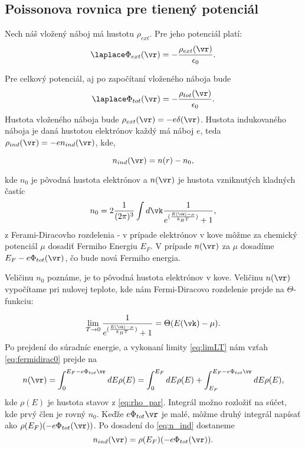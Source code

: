 \renewcommand{\thesection}{B.\arabic{section}}
\renewcommand{\theequation}{B.\arabic{equation}}
\renewcommand{\thefigure}{B.\arabic{figure}}
\setcounter{equation}{0}
\subsection*{Poissonova rovnica pre tienený potenciál}
Nech náš vložený náboj má hustotu $\rho_{ext}$. Pre jeho potenciál platí:
\begin{equation}
 \label{eq:poisext}
 \laplace \Phi_{ext}(\vr)=-\frac{\rho_{ext}(\vr)}{\epsilon_0} \text{.}
\end{equation} 

Pre celkový potenciál, aj po započítaní vloženého náboja bude 
\begin{equation}
 \label{eq:poistot}
 \laplace \Phi_{tot}(\vr)=-\frac{\rho_{tot}(\vr)}{\epsilon_0} \text{.}
\end{equation}
Hustota vloženého náboja bude $\rho_{ext}(\vr)=-e\delta(\vr)$. Hustota indukovaného náboja je daná hustotou elektrónov každý má náboj $e$, teda $\rho_{ind}(\vr)=-en_{ind}(\vr)$,
kde,

\begin{equation}
 \label{eq:n_ind}
 n_{ind}(\vr)=n(r)-n_0 \text{,}
\end{equation} 

kde $n_0$ je pôvodná hustota elektrónov a $n(\vr)$ je hustota vzniknutých kladných častíc 
\begin{equation}
 \label{eq:fermidirac0}
 n_0=2\frac{1}{(2\pi)^3}\int d\vk \frac{1}{e^{(\frac{E(\vk)-\mu}{k_BT})}+1} \text{,}
\end{equation} 
 z Ferami-Diracovho rozdelenia - v prípade elektrónov v kove môžme za chemický  potenciál $\mu$ dosadiť Fermiho Energiu $E_F$.
 V prípade $n(\vr)$ za $\mu$ dosadíme $E_F-e\Phi_{tot}(\vr)$, čo bude nová Fermiho energia.
 
 Veličinu $n_0$ poznáme, je to pôvodná hustota elektrónov v kove. Veličinu $n(\vr)$ vypočítame pri nulovej teplote, kde nám Fermi-Diracovo rozdelenie
 prejde na $\Theta$-funkciu:
 
 \begin{equation}
  \label{eq:limLT}
  \lim_{T\to 0} \frac{1}{e^{(\frac{E(\vk)-\mu}{k_BT})}+1}=\Theta(E(\vk)-\mu) \text{.}
 \end{equation} 
 Po prejdení do súradníc energie, a vykonaní limity \eqref{eq:limLT} nám vzťah \eqref{eq:fermidirac0} prejde na 
 \begin{equation}
  \label{eq:nr}
  n(\vr)=\int_{0}^{E_F-e\Phi_{tot}{\vr}}dE \rho(E)=\int_{0}^{E_F}dE \rho(E) + \int_{E_F}^{E_F-e\Phi_{tot}{\vr}}dE \rho(E) \text{,}
 \end{equation} 
 kde $\rho(E)$ je hustota stavov z \eqref{eq:rho_par}. Integrál možno rozložiť na súčet, kde prvý člen je rovný $n_0$. 
 Keďže $e\Phi_{tot}{\vr}$ je malé, môžme druhý integrál napísať ako $\rho(E_F)(-e\Phi_{tot}(\vr))$. Po dosadení do \eqref{eq:n_ind} dostaneme  
 \begin{equation}
  \label{eq:n_ind_final}
n_{ind}(\vr)=\rho(E_F)(-e\Phi_{tot}(\vr))\text{.}
 \end{equation} 
  
